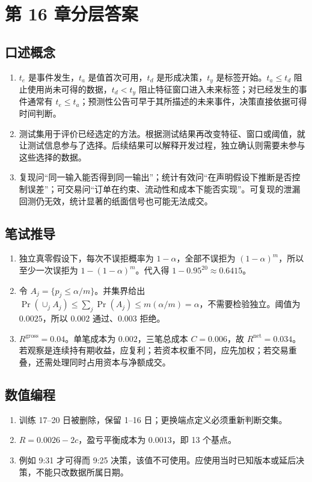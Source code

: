 \chapter{第 16 章分层答案}
\label{app:ch16-solutions}

\section*{口述概念}
\begin{enumerate}[leftmargin=*]
  \item $t_e$ 是事件发生，$t_a$ 是值首次可用，$t_d$ 是形成决策，$t_y$ 是标签开始。$t_a\le t_d$ 阻止使用尚未可得的数据，$t_d<t_y$ 阻止特征窗口进入未来标签；对已经发生的事件通常有 $t_e\le t_a$；预测性公告可早于其所描述的未来事件，决策直接依据可得时间判断。
  \item 测试集用于评价已经选定的方法。根据测试结果再改变特征、窗口或阈值，就让测试信息参与了选择。后续结果可以解释开发过程，独立确认则需要未参与这些选择的数据。
  \item 复现问“同一输入能否得到同一输出”；统计有效问“在声明假设下推断是否控制误差”；可交易问“订单在约束、流动性和成本下能否实现”。可复现的泄漏回测仍无效，统计显著的纸面信号也可能无法成交。
\end{enumerate}

\section*{笔试推导}
\begin{enumerate}[leftmargin=*]
  \item 独立真零假设下，每次不误拒概率为 $1-\alpha$，全部不误拒为 $(1-\alpha)^m$，所以至少一次误拒为 $1-(1-\alpha)^m$。代入得 $1-0.95^{20}\approx0.6415$。
  \item 令 $A_j=\{p_j\le\alpha/m\}$。并集界给出
  $\Pr(\cup_jA_j)\le\sum_j\Pr(A_j)\le m(\alpha/m)=\alpha$，不需要检验独立。阈值为 $0.0025$，所以 $0.002$ 通过、$0.003$ 拒绝。
  \item $R^{\mathrm{gross}}=0.04$。单笔成本为 $0.002$，三笔总成本 $C=0.006$，故 $R^{\mathrm{net}}=0.034$。若观察是连续持有期收益，应复利；若资本权重不同，应先加权；若交易重叠，还需处理同时占用资本与净额成交。
\end{enumerate}

\section*{数值编程}
\begin{enumerate}[leftmargin=*]
  \item 训练 17--20 日被删除，保留 1--16 日；更换端点定义必须重新判断交集。
  \item $R=0.0026-2c$，盈亏平衡成本为 $0.0013$，即 13 个基点。
  \item 例如 9:31 才可得而 9:25 决策，该值不可使用。应使用当时已知版本或延后决策，不能只改数据所属日期。
\end{enumerate}

